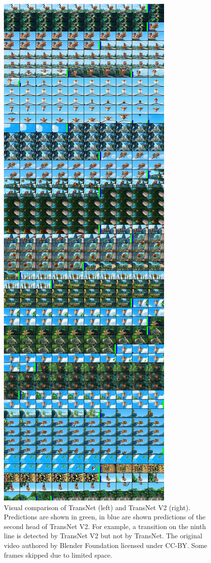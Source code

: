 \begin{figure}[h]
    \includegraphics[align=c,width=.49\textwidth]{img/pred.jpg}
    \caption[Visual comparison of TransNet and TransNet V2]{Visual comparison of TransNet (left) and TransNet V2 (right). Predictions are shown in green, in blue are shown predictions of the second head of TransNet V2. For example, a transition on the ninth line is detected by TransNet V2 but not by TransNet. The original video authored by Blender Foundation licensed under CC-BY. Some frames skipped due to limited space.}
    \label{fig:transnet_v1_v2_visualization_comparison}
\end{figure}
